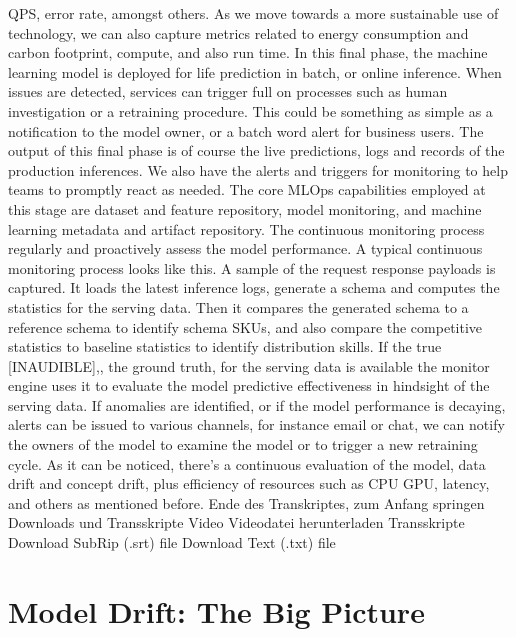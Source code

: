{{{{{{{{    QPS, error rate, amongst others.
    As we move towards a more sustainable use of technology,
    we can also capture metrics related to energy consumption and carbon
    footprint, compute, and also run time.
    In this final phase, the machine learning model
    is deployed for life prediction in batch, or online inference.
    When issues are detected, services can trigger full
    on processes such as human investigation or a retraining procedure.
    This could be something as simple as a notification to the model
    owner, or a batch word alert for business users.
    The output of this final phase is of course
    the live predictions, logs and records of the production inferences.
    We also have the alerts and triggers for monitoring to help teams to promptly
    react as needed.
    The core MLOps capabilities employed at this stage
    are dataset and feature repository, model monitoring,
    and machine learning metadata and artifact repository.
    The continuous monitoring process regularly and proactively assess
    the model performance.
    A typical continuous monitoring process looks like this.
    A sample of the request response payloads is captured.
    It loads the latest inference logs, generate a schema
    and computes the statistics for the serving data.
    Then it compares the generated schema to a reference schema
    to identify schema SKUs, and also compare the competitive statistics
    to baseline statistics to identify distribution skills.
    If the true [INAUDIBLE],, the ground truth, for the serving data
    is available the monitor engine uses it to evaluate
    the model predictive effectiveness in hindsight of the serving data.
    If anomalies are identified, or if the model performance is decaying,
    alerts can be issued to various channels, for instance email or chat,
    we can notify the owners of the model to examine the model
    or to trigger a new retraining cycle.
    As it can be noticed, there's a continuous evaluation
    of the model, data drift and concept drift,
    plus efficiency of resources such as CPU GPU, latency, and others
    as mentioned before.
    Ende des Transkriptes, zum Anfang springen
    Downloads und Transskripte
    Video
    Videodatei herunterladen
    Transskripte
    Download SubRip (.srt) file
    Download Text (.txt) file   
   
\section{Model Drift: The Big Picture}

}}}}}}}}
